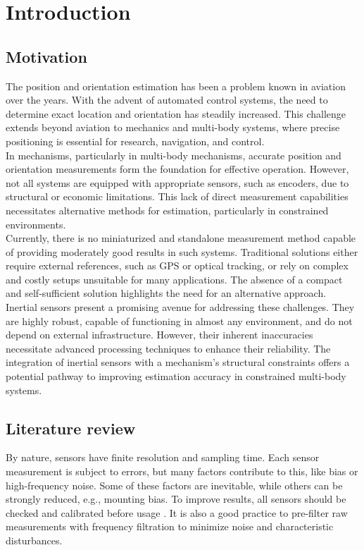 \section{Introduction}

\subsection{Motivation}
The position and orientation estimation has been a problem known in aviation over the years. With the advent of automated control systems, the need to determine exact location and orientation has steadily increased. This challenge extends beyond aviation to mechanics and multi-body systems, where precise positioning is essential for research, navigation, and control.\\

In mechanisms, particularly in multi-body mechanisms, accurate position and orientation measurements form the foundation for effective operation. However, not all systems are equipped with appropriate sensors, such as encoders, due to structural or economic limitations. This lack of direct measurement capabilities necessitates alternative methods for estimation, particularly in constrained environments.\\

Currently, there is no miniaturized and standalone measurement method capable of providing moderately good results in such systems. Traditional solutions either require external references, such as GPS or optical tracking, or rely on complex and costly setups unsuitable for many applications. The absence of a compact and self-sufficient solution highlights the need for an alternative approach.\\

Inertial sensors present a promising avenue for addressing these challenges. They are highly robust, capable of functioning in almost any environment, and do not depend on external infrastructure. However, their inherent inaccuracies necessitate advanced processing techniques to enhance their reliability. The integration of inertial sensors with a mechanism’s structural constraints offers a potential pathway to improving estimation accuracy in constrained multi-body systems.

\subsection{Literature review}

By nature, sensors have finite resolution and sampling time. Each sensor measurement is subject to errors, but many factors contribute to this, like bias or high-frequency noise. Some of these factors are inevitable, while others can be strongly reduced, e.g., mounting bias. To improve results, all sensors should be checked and calibrated before usage \cite{mi13060879} \cite{Hol_2011} \cite{gyro_calib}. It is also a good practice to pre-filter raw measurements with frequency filtration \cite{BADRI20101425} to minimize noise and characteristic disturbances. \\

